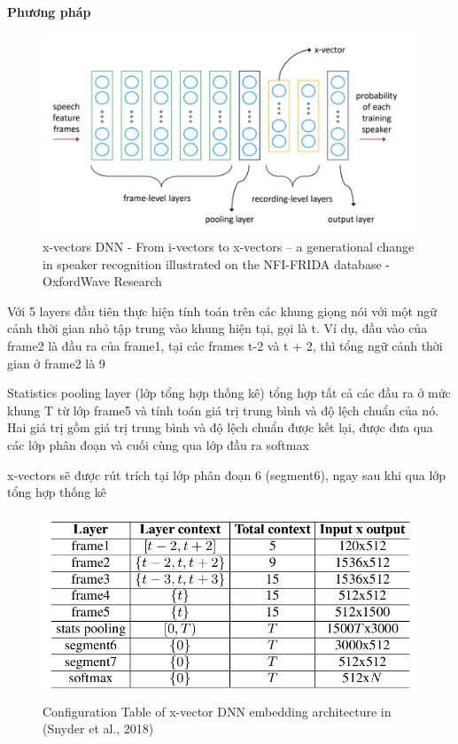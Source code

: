 \documentclass{article}
\begin{document}
	\textbf{Phương pháp}
	\begin{figure}[H]
		\centering
		\includegraphics[width=0.75\linewidth]{images/x_vectors_dnn.png}
		\caption{x-vectors DNN - From i-vectors to x-vectors – a generational change in speaker recognition illustrated on the NFI-FRIDA database - OxfordWave Research}
		\label{fig:writing-thesis}
	\end{figure}
	Với 5 layers đầu tiên thực hiện tính toán trên các khung giọng nói với một ngữ cảnh thời gian nhỏ tập trung vào khung hiện tại, gọi là t. Ví dụ, đầu vào của frame2 là đầu ra của frame1, tại các frames t-2 và t + 2, thì tổng ngữ cảnh thời gian ở frame2 là 9
	
	Statistics pooling layer (lớp tổng hợp thống kê) tổng hợp tất cả các đầu ra ở mức khung T từ lớp frame5 và tính toán giá trị trung bình và độ lệch chuẩn của nó. Hai giá trị gồm giá trị trung bình và độ lệch chuẩn được kết lại, được đưa qua các lớp phân đoạn và cuối cùng qua lớp đầu ra softmax
	
	x-vectors sẽ được rút trích tại lớp phân đoạn 6 (segment6), ngay sau khi qua lớp tổng hợp thống kê
	
	\begin{figure}[H]
		\centering
		\includegraphics[width=0.75\linewidth]{images/x-vectors-setup.png}
		\caption{Configuration Table of x-vector DNN embedding architecture in (Snyder et al., 2018)}
		\label{fig:writing-thesis}
	\end{figure}
\end{document}
